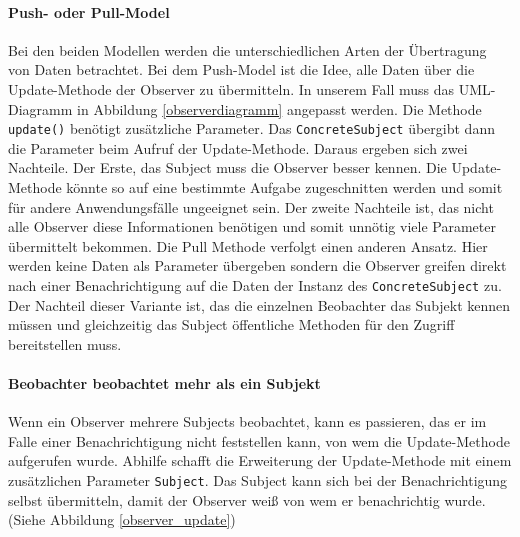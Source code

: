 \paragraph{Push- oder Pull-Model} 


Bei den beiden Modellen werden die unterschiedlichen Arten der Übertragung von Daten betrachtet. Bei dem Push-Model ist die Idee, alle Daten über die Update-Methode der Observer zu übermitteln. In unserem Fall muss das UML-Diagramm in Abbildung \ref{observerdiagramm} angepasst werden. Die Methode \texttt{update()} benötigt  zusätzliche Parameter. Das \texttt{ConcreteSubject} übergibt dann die Parameter beim Aufruf der Update-Methode.
Daraus ergeben sich zwei Nachteile. Der Erste, das Subject muss die Observer besser kennen. Die Update-Methode könnte so auf eine bestimmte Aufgabe zugeschnitten werden und somit für andere Anwendungsfälle ungeeignet sein. Der zweite Nachteile ist, das nicht alle Observer diese Informationen benötigen und somit unnötig viele Parameter übermittelt bekommen.
Die Pull Methode verfolgt einen anderen Ansatz. Hier werden keine Daten als Parameter übergeben sondern die Observer greifen direkt nach einer Benachrichtigung auf die Daten der Instanz des \texttt{ConcreteSubject} zu. Der Nachteil dieser Variante ist, das die einzelnen Beobachter das Subjekt kennen müssen und gleichzeitig das Subject öffentliche Methoden für den Zugriff bereitstellen muss.


\paragraph{Beobachter beobachtet mehr als ein Subjekt} Wenn ein Observer mehrere Subjects beobachtet, kann es passieren, das er im Falle einer Benachrichtigung nicht feststellen kann, von wem die Update-Methode aufgerufen wurde. Abhilfe schafft die Erweiterung der Update-Methode mit einem zusätzlichen Parameter \texttt{Subject}. Das Subject kann sich bei der Benachrichtigung selbst übermitteln, damit der Observer weiß von wem er benachrichtig wurde. (Siehe Abbildung \ref{observer_update})

